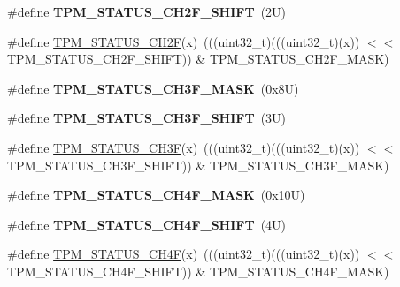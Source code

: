 \begin{DoxyCompactItemize}
\mbox{\label{group___t_p_m___register___masks_ga99af753c0fea3de796c9226db4d5c9f3}} 
\#define {\bfseries T\+P\+M\+\_\+\+S\+T\+A\+T\+U\+S\+\_\+\+C\+H2\+F\+\_\+\+S\+H\+I\+FT}~(2\+U)
\item 
\#define \mbox{\hyperlink{group___t_p_m___register___masks_ga7c32f74e206b5591505f7642ef514971}{T\+P\+M\+\_\+\+S\+T\+A\+T\+U\+S\+\_\+\+C\+H2F}}(x)~(((uint32\+\_\+t)(((uint32\+\_\+t)(x)) $<$$<$ T\+P\+M\+\_\+\+S\+T\+A\+T\+U\+S\+\_\+\+C\+H2\+F\+\_\+\+S\+H\+I\+FT)) \& T\+P\+M\+\_\+\+S\+T\+A\+T\+U\+S\+\_\+\+C\+H2\+F\+\_\+\+M\+A\+SK)
\item 
\mbox{\label{group___t_p_m___register___masks_gaf38a26c12fe2fb6eaa5bc39bba39a500}} 
\#define {\bfseries T\+P\+M\+\_\+\+S\+T\+A\+T\+U\+S\+\_\+\+C\+H3\+F\+\_\+\+M\+A\+SK}~(0x8\+U)
\item 
\mbox{\label{group___t_p_m___register___masks_ga4d0b65d9b967127713fdddd70a654c50}} 
\#define {\bfseries T\+P\+M\+\_\+\+S\+T\+A\+T\+U\+S\+\_\+\+C\+H3\+F\+\_\+\+S\+H\+I\+FT}~(3\+U)
\item 
\#define \mbox{\hyperlink{group___t_p_m___register___masks_gab657cadf3ff2856cf6ded71e879b5867}{T\+P\+M\+\_\+\+S\+T\+A\+T\+U\+S\+\_\+\+C\+H3F}}(x)~(((uint32\+\_\+t)(((uint32\+\_\+t)(x)) $<$$<$ T\+P\+M\+\_\+\+S\+T\+A\+T\+U\+S\+\_\+\+C\+H3\+F\+\_\+\+S\+H\+I\+FT)) \& T\+P\+M\+\_\+\+S\+T\+A\+T\+U\+S\+\_\+\+C\+H3\+F\+\_\+\+M\+A\+SK)
\item 
\mbox{\label{group___t_p_m___register___masks_ga6d71ec16664cd555736bd39d2b0aef50}} 
\#define {\bfseries T\+P\+M\+\_\+\+S\+T\+A\+T\+U\+S\+\_\+\+C\+H4\+F\+\_\+\+M\+A\+SK}~(0x10\+U)
\item 
\mbox{\label{group___t_p_m___register___masks_gacacfe3eeb25b42db72340d8f7644b293}} 
\#define {\bfseries T\+P\+M\+\_\+\+S\+T\+A\+T\+U\+S\+\_\+\+C\+H4\+F\+\_\+\+S\+H\+I\+FT}~(4\+U)
\item 
\#define \mbox{\hyperlink{group___t_p_m___register___masks_gad6668d58f2982ead98fcacf1a31a9b5a}{T\+P\+M\+\_\+\+S\+T\+A\+T\+U\+S\+\_\+\+C\+H4F}}(x)~(((uint32\+\_\+t)(((uint32\+\_\+t)(x)) $<$$<$ T\+P\+M\+\_\+\+S\+T\+A\+T\+U\+S\+\_\+\+C\+H4\+F\+\_\+\+S\+H\+I\+FT)) \& T\+P\+M\+\_\+\+S\+T\+A\+T\+U\+S\+\_\+\+C\+H4\+F\+\_\+\+M\+A\+SK)
$$
\end{DoxyCompactItemize}
